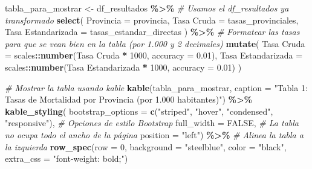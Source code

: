\documentclass[
]{article}
\newenvironment{Shaded}{\begin{snugshade}}{\end{snugshade}}
\newcommand{\AttributeTok}[1]{\textcolor[rgb]{0.13,0.29,0.53}{#1}}
\newcommand{\CommentTok}[1]{\textcolor[rgb]{0.56,0.35,0.01}{\textit{#1}}}
\newcommand{\ConstantTok}[1]{\textcolor[rgb]{0.56,0.35,0.01}{#1}}
\newcommand{\DecValTok}[1]{\textcolor[rgb]{0.00,0.00,0.81}{#1}}
\newcommand{\FloatTok}[1]{\textcolor[rgb]{0.00,0.00,0.81}{#1}}
\newcommand{\FunctionTok}[1]{\textcolor[rgb]{0.13,0.29,0.53}{\textbf{#1}}}
\newcommand{\NormalTok}[1]{#1}
\newcommand{\OtherTok}[1]{\textcolor[rgb]{0.56,0.35,0.01}{#1}}
\newcommand{\SpecialCharTok}[1]{\textcolor[rgb]{0.81,0.36,0.00}{\textbf{#1}}}
\newcommand{\StringTok}[1]{\textcolor[rgb]{0.31,0.60,0.02}{#1}}
\begin{document}
\begin{Shaded}
\begin{Highlighting}[]
\NormalTok{tabla\_para\_mostrar }\OtherTok{\textless{}{-}}\NormalTok{ df\_resultados }\SpecialCharTok{\%\textgreater{}\%} \CommentTok{\# Usamos el df\_resultados ya transformado}
  \FunctionTok{select}\NormalTok{(}
    \AttributeTok{Provincia =}\NormalTok{ provincia,}
    \StringTok{\textasciigrave{}}\AttributeTok{Tasa Cruda}\StringTok{\textasciigrave{}} \OtherTok{=}\NormalTok{ tasas\_provinciales,}
    \StringTok{\textasciigrave{}}\AttributeTok{Tasa Estandarizada}\StringTok{\textasciigrave{}} \OtherTok{=}\NormalTok{ tasas\_estandar\_directas}
\NormalTok{  ) }\SpecialCharTok{\%\textgreater{}\%}
  \CommentTok{\# Formatear las tasas para que se vean bien en la tabla (por 1.000 y 2 decimales)}
  \FunctionTok{mutate}\NormalTok{(}
    \StringTok{\textasciigrave{}}\AttributeTok{Tasa Cruda}\StringTok{\textasciigrave{}} \OtherTok{=}\NormalTok{ scales}\SpecialCharTok{::}\FunctionTok{number}\NormalTok{(}\StringTok{\textasciigrave{}}\AttributeTok{Tasa Cruda}\StringTok{\textasciigrave{}} \SpecialCharTok{*} \DecValTok{1000}\NormalTok{, }\AttributeTok{accuracy =} \FloatTok{0.01}\NormalTok{),}
    \StringTok{\textasciigrave{}}\AttributeTok{Tasa Estandarizada}\StringTok{\textasciigrave{}} \OtherTok{=}\NormalTok{ scales}\SpecialCharTok{::}\FunctionTok{number}\NormalTok{(}\StringTok{\textasciigrave{}}\AttributeTok{Tasa Estandarizada}\StringTok{\textasciigrave{}} \SpecialCharTok{*} \DecValTok{1000}\NormalTok{, }\AttributeTok{accuracy =} \FloatTok{0.01}\NormalTok{)}
\NormalTok{  )}

\CommentTok{\# Mostrar la tabla usando kable}
\FunctionTok{kable}\NormalTok{(tabla\_para\_mostrar, }\AttributeTok{caption =} \StringTok{"Tabla 1: Tasas de Mortalidad por Provincia (por 1.000 habitantes)"}\NormalTok{) }\SpecialCharTok{\%\textgreater{}\%}
  \FunctionTok{kable\_styling}\NormalTok{(}
    \AttributeTok{bootstrap\_options =} \FunctionTok{c}\NormalTok{(}\StringTok{"striped"}\NormalTok{, }\StringTok{"hover"}\NormalTok{, }\StringTok{"condensed"}\NormalTok{, }\StringTok{"responsive"}\NormalTok{), }\CommentTok{\# Opciones de estilo Bootstrap}
    \AttributeTok{full\_width =} \ConstantTok{FALSE}\NormalTok{, }\CommentTok{\# La tabla no ocupa todo el ancho de la página}
    \AttributeTok{position =} \StringTok{"left"}\NormalTok{) }\SpecialCharTok{\%\textgreater{}\%}  \CommentTok{\# Alinea la tabla a la izquierda}
    \FunctionTok{row\_spec}\NormalTok{(}\AttributeTok{row =} \DecValTok{0}\NormalTok{, }\AttributeTok{background =} \StringTok{"steelblue"}\NormalTok{, }\AttributeTok{color =} \StringTok{"black"}\NormalTok{, }\AttributeTok{extra\_css =} \StringTok{"font{-}weight: bold;"}\NormalTok{)}
\end{Highlighting}
\end{Shaded}
\end{document}
